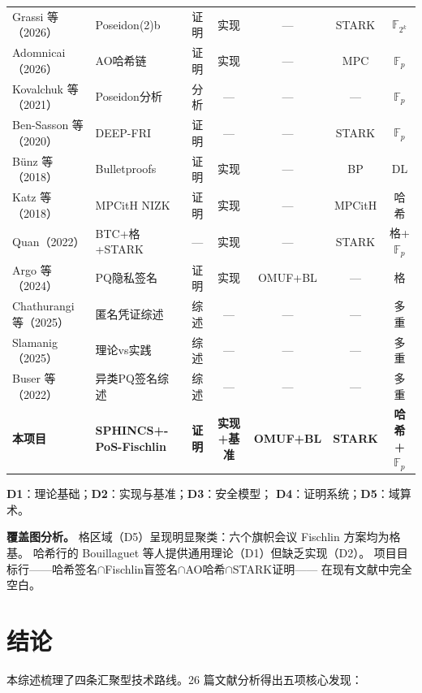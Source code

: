 \documentclass[11pt,a4paper]{ctexart}
\begin{document}
\begin{table}[h]
\begin{tabular}{@{}p{3.5cm}p{2.8cm}ccccc@{}}
Grassi 等（2026）\cite{Grassi2026Poseidon2b} & Poseidon(2)b & 证明 & 实现 & --- & STARK & $\mathbb{F}_{2^k}$ \\
Adomnicai（2026）\cite{Adomnicai2026} & AO哈希链 & 证明 & 实现 & --- & MPC & $\mathbb{F}_p$ \\
Kovalchuk 等（2021）\cite{2021Security} & Poseidon分析 & 分析 & --- & --- & --- & $\mathbb{F}_p$ \\
Ben-Sasson 等（2020）\cite{2019DEEP} & DEEP-FRI & 证明 & --- & --- & STARK & $\mathbb{F}_p$ \\
B\"unz 等（2018）\cite{Bunz2018Bulletproofs} & Bulletproofs & 证明 & 实现 & --- & BP & DL \\
Katz 等（2018）\cite{Katz2018ImprovedNIZK} & MPCitH NIZK & 证明 & 实现 & --- & MPCitH & 哈希 \\
Quan（2022）\cite{Quan2022} & BTC+格+STARK & --- & 实现 & --- & STARK & 格+$\mathbb{F}_p$ \\
Argo 等（2024）\cite{Argo2024PracticalPQ} & PQ隐私签名 & 证明 & 实现 & OMUF+BL & --- & 格 \\
Chathurangi 等（2025）\cite{Chathurangi2025Advances} & 匿名凭证综述 & 综述 & --- & --- & --- & 多重 \\
Slamanig（2025）\cite{Slamanig2025PrivacyAuth} & 理论vs实践 & 综述 & --- & --- & --- & 多重 \\
Buser 等（2022）\cite{Buser2022ExoticSigs} & 异类PQ签名综述 & 综述 & --- & --- & --- & 多重 \\
\midrule
\textbf{本项目} & \textbf{SPHINCS+-PoS-Fischlin} & \textbf{证明} & \textbf{实现+基准} & \textbf{OMUF+BL} & \textbf{STARK} & \textbf{哈希+$\mathbb{F}_p$} \\
\bottomrule
\end{tabular}
\end{table}

\textbf{D1}：理论基础；\textbf{D2}：实现与基准；\textbf{D3}：安全模型；
\textbf{D4}：证明系统；\textbf{D5}：域算术。

\textbf{覆盖图分析。}
格区域（D5）呈现明显聚类：六个旗帜会议 Fischlin 方案均为格基。
哈希行的 Bouillaguet 等人提供通用理论（D1）但缺乏实现（D2）。
项目目标行——哈希签名$\cap$Fischlin盲签名$\cap$AO哈希$\cap$STARK证明——
在现有文献中完全空白。

\section{结论}

本综述梳理了四条汇聚型技术路线。26 篇文献分析得出五项核心发现：
\end{document}
